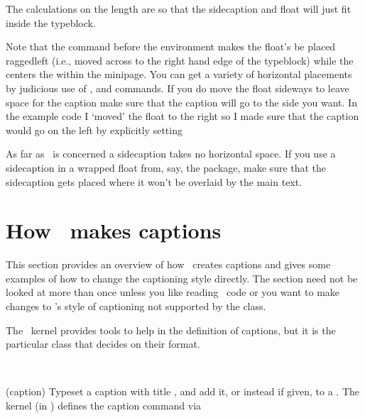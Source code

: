     The calculations on the  length are so that the sidecaption
and float will just fit inside the typeblock.

Note that the \cmd{\raggedleft} command before the  environment
makes the float's  be placed raggedleft (i.e., moved across to
the right hand edge of the typeblock) while the \cmd{\centering} centers
the  within the minipage. You can get a variety of horizontal
placements by judicious use of \cmd{\raggedright}, \cmd{\centering}
and \cmd{\raggedleft} commands. If you do move the float sideways to leave
space for the caption make sure that the caption will go to the side you
want. In the example code I `moved' the float to the right so I made
sure that the caption would go on the left by explicitly setting
\begin{lcode}
\end{lcode}

    As far as \tx\ is concerned a sidecaption takes no horizontal space. If
you use a sidecaption in a wrapped float from, say, the  
package, make sure that the sidecaption gets placed where it won't be 
overlaid by the main text.


 \section{How \ltx\ makes captions} \label{sec:ltx}%


 This section provides an overview of how \ltx\ creates captions and
 gives some examples of how to change the captioning style directly.
 The section need not be looked at more than once unless you like 
 reading \ltx\ code
 or you want to make changes to \ltx's style of captioning not supported
by the class.

 The \ltx\ kernel provides tools to help in the definition of captions,
 but it is the particular class that decides on their format.

\begin{syntax}
 \cmd{\caption} \\
\end{syntax}
\glossary(caption)%
  {}%
  {Typeset a caption with title , and add it, or 
   instead if given, to a \listofx.} 
 The kernel (in ) defines the caption command via 
\begin{lcode}
\def\caption{%
    \refstepcounter\@captype \@dblarg{\@caption\@captype}}
\end{lcode}

